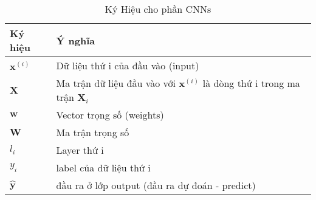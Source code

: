 \begin{table}[]

\caption{Ký Hiệu cho phần CNNs}
\label{my-label}
\renewcommand{\arraystretch}{2}
\hspace*{20mm}
\begin{tabular}{p{3cm} p{10cm} }
Ký hiệu & Ý nghĩa\\
\hline
$\textbf{x}^{(i)}$ 	& Dữ liệu thứ i của đầu vào (input)\\
$\textbf{X}$ 	& Ma trận dữ liệu đầu vào với $\textbf{x}^{(i)} $ là dòng thứ i trong ma trận $\textbf{X}_i$ \\

$\textbf{w}$ & Vector trọng số (weights) \\
$\textbf{W}$ & Ma trận trọng số\\

$l_i$ & Layer thứ i\\
$y_i$ & label của dữ liệu thứ i\\
$\widehat{\textbf{y}}$ & đầu ra ở lớp output (đầu ra dự đoán - predict)\\


\end{tabular}

\end{table}

